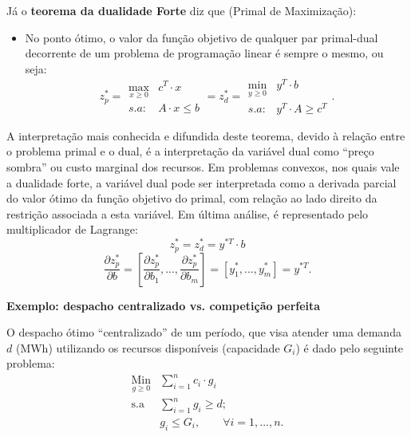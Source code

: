Já o \textbf{teorema da dualidade Forte} diz que (Primal de Maximização):
\begin{itemize}
\item No ponto ótimo, o valor da função objetivo de qualquer par primal-dual decorrente de um problema de programação linear é sempre o mesmo, ou seja:
$$
z_{p}^{*}=\begin{array}{cc}
\max_{x\geq0} & c^{T}\cdot x\\
s.a: & A\cdot x\leq b
\end{array} = z_{d}^{*}=\begin{array}{cc}
\min_{y\geq0} & y^{T}\cdot b\\
s.a: & y^{T}\cdot A\geq c^{T}
\end{array}.
$$
\end{itemize}
A interpretação mais conhecida e difundida
deste teorema, devido à relação entre o problema primal e o dual,
é a interpretação da variável dual como ``preço sombra'' ou custo
marginal dos recursos. Em problemas convexos, nos quais vale a dualidade forte, a variável dual pode ser interpretada como a derivada parcial do valor ótimo da função objetivo do primal, com relação ao lado direito da restrição associada
a esta variável. Em última análise, é representado pelo multiplicador de Lagrange:
\[
z_{p}^{*}=z_{d}^{*}=y^{*T}\cdot b
\]
\[
\frac{\partial z_{p}^{*}}{\partial b}=\left[\frac{\partial z_{p}^{*}}{\partial b_{1}},...,\frac{\partial z_{p}^{*}}{\partial b_{m}}\right]=\left[y_{1}^{*},...,y_{m}^{*}\right]=y^{*T}.
\]

\textbf{Exemplo: despacho centralizado vs. competição perfeita}

O despacho ótimo ``centralizado'' de um período, que visa atender uma demanda $d$ (MWh) utilizando os recursos disponíveis (capacidade $G_{i}$) é dado pelo seguinte problema:
\begin{align}
	\underset{g\geq0}{\text{Min}} & \sum_{i=1}^{n}c_{i}\cdot g_{i}\label{eq12}\\
	\text{s.a} & \sum_{i=1}^{n}g_{i}\geq d;\label{eq13}\\
	 & g_{i}\leq G_{i}, \qquad\forall i=1,...,n.\label{eq14}
\end{align}

